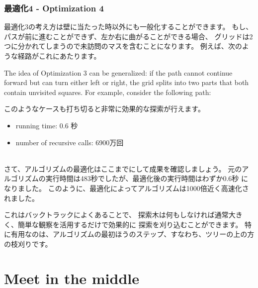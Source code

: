 \subsubsection{最適化4 - Optimization 4}

最適化3の考え方は壁に当たった時以外にも一般化することができます。
もし、パスが前に進むことができず、左か右に曲がることができる場合、
グリッドは2つに分かれてしまうので未訪問のマスを含むことになります。
例えば、次のような経路がこれにあたります。

The idea of Optimization 3
can be generalized:
if the path cannot continue forward
but can turn either left or right,
the grid splits into two parts
that both contain unvisited squares.
For example, consider the following path:

\begin{center}
\end{center}

このようなケースも打ち切ると非常に効果的な探索が行えます。

\begin{itemize}
\item
running time: 0.6 秒
\item
number of recursive calls: 6900万回
\end{itemize}

~\\
さて、アルゴリズムの最適化はここまでにして成果を確認しましょう。
元のアルゴリズムの実行時間は483秒でしたが、最適化後の実行時間はわずか0.6秒 になりました。
このように、最適化によってアルゴリズムは1000倍近く高速化されました。

これはバックトラックによくあることで、
探索木は何もしなければ通常大きく、簡単な観察を活用するだけで効果的に
探索を刈り込むことができます。
特に有用なのは、アルゴリズムの最初ほうのステップ、すなわち、ツリーの上の方の枝刈りです。

\section{Meet in the middle}

